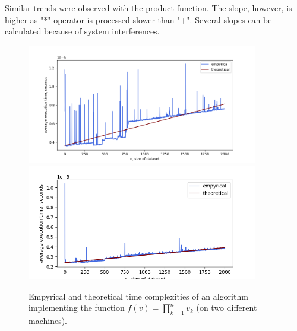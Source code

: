 \documentclass[12pt, a4paper]{article}
\begin{document}
Similar trends were observed with the product function. The slope, however, is higher as "*" operator is processed slower than "+". Several slopes can be calculated because of system interferences.
\begin{figure}[!h]
\centering
\includegraphics[width=0.9\textwidth]{prod.png}
\includegraphics[width=0.9\textwidth]{valeria/prod.png}
\caption{Empyrical and theoretical time complexities of an algorithm implementing the function $f(v)=\prod_{k=1}^{n} v_k$ (on two different machines).}
\end{figure}

\newpage
\end{document}
